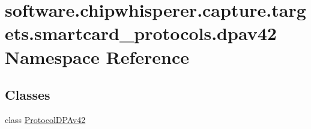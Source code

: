 \hypertarget{namespacesoftware_1_1chipwhisperer_1_1capture_1_1targets_1_1smartcard__protocols_1_1dpav42}{}\section{software.\+chipwhisperer.\+capture.\+targets.\+smartcard\+\_\+protocols.\+dpav42 Namespace Reference}
\label{namespacesoftware_1_1chipwhisperer_1_1capture_1_1targets_1_1smartcard__protocols_1_1dpav42}
\subsection*{Classes}
\begin{DoxyCompactItemize}
\item 
class \hyperlink{classsoftware_1_1chipwhisperer_1_1capture_1_1targets_1_1smartcard__protocols_1_1dpav42_1_1ProtocolDPAv42}{Protocol\+D\+P\+Av42}
\end{DoxyCompactItemize}
